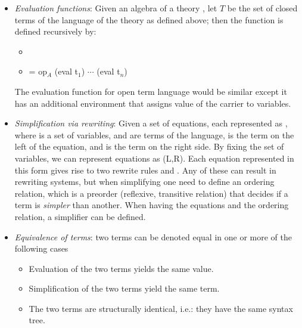 \begin{itemize}
\begin{itemize}
    \end{itemize}     
    \item \emph{Evaluation functions}: Given an algebra  of a theory \lstmath{$\Gamma = (\sort,\fsyms,\equations$)}, let $T$ be the set of closed terms of the language of the theory as defined above; then the function  is defined recursively by:  
    \begin{itemize}
        \item {}
        \item {} = op$_A$ (eval t$_1$) $\cdots$ (eval t$_n$) 
    \end{itemize}      
    The evaluation function for open term language would be similar except it has an additional environment that assigns value of the carrier to variables. 
    \item \emph{Simplification via rewriting}: Given a set of equations, each represented as , where  is a set of variables,  and  are terms of the language,  is the term on the left of the equation, and  is the term on the right side. By fixing the set of variables, we can represent equations as  (L,R). Each equation represented in this form gives rise to two rewrite rules  and . Any of these can result in rewriting systems, but when simplifying one need to define an ordering relation, which is a preorder (reflexive, transitive relation) that decides if a term is \emph{simpler} than another. When having the equations and the ordering relation, a simplifier can be defined. 
    \item \emph{Equivalence of terms}: two terms can be denoted equal in one or more of the following cases 
    \begin{itemize}
        \item Evaluation of the two terms yields the same value. 
        \item Simplification of the two terms yield the same term. 
        \item The two terms are structurally identical, i.e.: they have the same syntax tree. 
    \end{itemize}
\end{itemize}


